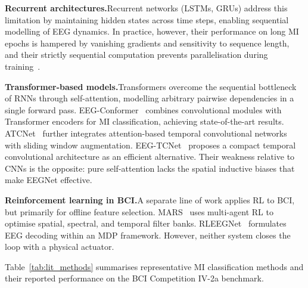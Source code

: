 \documentclass[12pt, a4paper]{article}
\begin{document}
\textbf{Recurrent architectures.}\quad Recurrent networks (LSTMs, GRUs) address this limitation by maintaining hidden states across time steps, enabling sequential modelling of EEG dynamics. In practice, however, their performance on long MI epochs is hampered by vanishing gradients and sensitivity to sequence length, and their strictly sequential computation prevents parallelisation during training~\cite{vaswani2017attention}.

\textbf{Transformer-based models.}\quad Transformers overcome the sequential bottleneck of RNNs through self-attention, modelling arbitrary pairwise dependencies in a single forward pass. EEG-Conformer~\cite{song2022eeg} combines convolutional modules with Transformer encoders for MI classification, achieving state-of-the-art results. ATCNet~\cite{altaheri2022atcnet} further integrates attention-based temporal convolutional networks with sliding window augmentation. EEG-TCNet~\cite{ingolfsson2020eeg} proposes a compact temporal convolutional architecture as an efficient alternative. Their weakness relative to CNNs is the opposite: pure self-attention lacks the spatial inductive biases that make EEGNet effective.

\textbf{Reinforcement learning in BCI.}\quad A separate line of work applies RL to BCI, but primarily for offline feature selection. MARS~\cite{shin2024mars} uses multi-agent RL to optimise spatial, spectral, and temporal filter banks. RLEEGNet~\cite{nallani2024rleegnet} formulates EEG decoding within an MDP framework. However, neither system closes the loop with a physical actuator.

Table~\ref{tab:lit_methods} summarises representative MI classification methods and their reported performance on the BCI Competition IV-2a benchmark.
\end{document}
